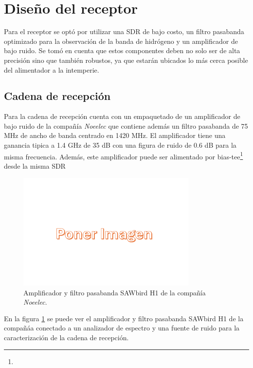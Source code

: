 \section{Diseño del receptor}

Para el receptor se optó por utilizar una SDR de bajo costo, un filtro pasabanda optimizado para la observación de la banda de hidrógeno y un amplificador de bajo ruido. Se tomó en cuenta que estos componentes deben no solo ser de alta precisión sino que también robustos, ya que estarán ubicados lo más cerca posible del alimentador a la intemperie.\\

\subsection{Cadena de recepción}

Para la cadena de recepción cuenta con un empaquetado de un amplificador de bajo ruido de la compañía \textit{Noeelec} que contiene además un filtro pasabanda de 75 MHz de ancho de banda centrado en 1420 MHz. El amplificador tiene una ganancia tipica a 1.4 GHz de 35 dB con una figura de ruido de 0.6 dB para la misma frecuencia. Además, este amplificador puede ser alimentado por bias-tee\footnote{} desde la misma SDR\\

\begin{figure}
    \centering
    \includegraphics[width=0.8\textwidth]{img/imagen}
    \caption{Amplificador y filtro pasabanda SAWbird H1 de la compañía \textit{Noeelec}.}
    \label{fig:cadena}
\end{figure}

En la figura \ref{fig:cadena} se puede ver el amplificador y filtro pasabanda SAWbird H1 de la compañáa conectado a un analizador de espectro y una fuente de ruido para la caracterización de la cadena de recepción.\\

